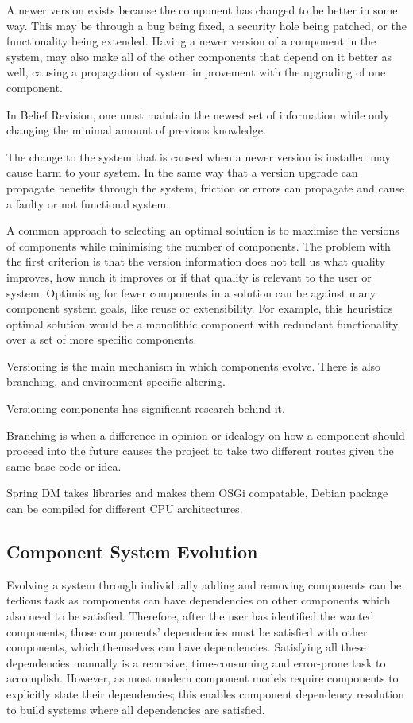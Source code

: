 A newer version exists because the component has changed to be better in some way.
This may be through a bug being fixed, a security hole being patched, or the functionality being extended.
Having a newer version of a component in the system, may also make all of the other components that depend on it better as well,
causing a propagation of system improvement with the upgrading of one component.

In Belief Revision, one must maintain the newest set of information while only changing the minimal amount of previous knowledge. 

The change to the system that is caused when a newer version is installed may cause harm to your system.
In the same way that a version upgrade can propagate benefits through the system, 
friction or errors can propagate and cause a faulty or not functional system.

A common approach to selecting an optimal solution is to
maximise the versions of components while minimising the number of components.
The problem with the first criterion is that the version information does not tell us what quality improves, 
how much it improves or if that quality is relevant to the user or system.
Optimising for fewer components in a solution can be against many component system goals, like reuse or extensibility.
For example, this heuristics optimal solution would be a monolithic component with redundant functionality, over 
a set of more specific components. 


Versioning is the main mechanism in which components evolve.
There is also branching, and environment specific altering.

Versioning components has significant research behind it.

Branching is when a difference in opinion or idealogy on how a component should proceed into the future
causes the project to take two different routes given the same base code or idea.

Spring DM takes libraries and makes them OSGi compatable, 
Debian package can be compiled for different CPU architectures.


\subsection{Component System Evolution}
Evolving a system through individually adding and removing components can be tedious task 
as components can have dependencies on other components which also need to be satisfied.
Therefore, after the user has identified the wanted components, 
those components' dependencies must be satisfied with other components, which themselves can have dependencies.
Satisfying all these dependencies manually is a recursive, time-consuming and error-prone task to accomplish.
However, as most modern component models require components to explicitly state their dependencies; 
this enables component dependency resolution to build systems where all dependencies are satisfied.

